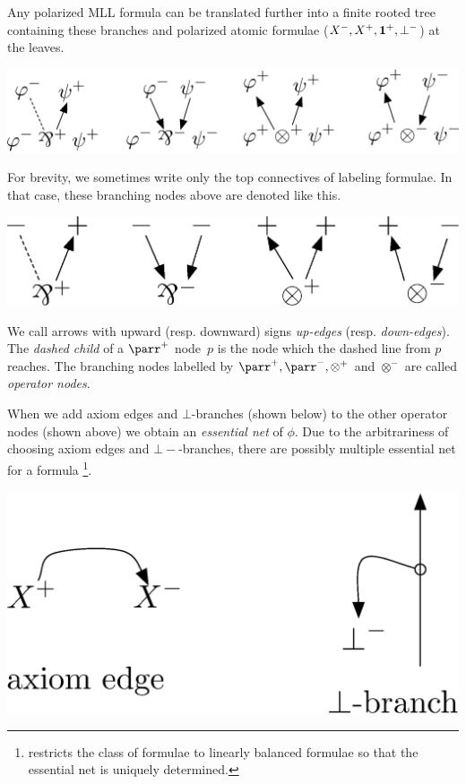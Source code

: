 Any polarized MLL formula can be translated further into
a finite rooted tree containing these branches and polarized atomic formulae
($X^-, X^+, \mathbf{1}^+,\bot^-$) at the leaves.
 \begin{center}
  \includegraphics[scale=0.4]{rules-original.eps}
 \end{center}
For brevity, we sometimes write only the top connectives of labeling
formulae.
In that case, these branching nodes above are denoted like this.
 \begin{center} %
  \includegraphics[scale=0.4]{rules.eps}
 \end{center}
We call arrows with upward (resp. downward) signs
\textit{up-edges}
(resp. \textit{down-edges}).
The \textit{dashed child}
of a $\parr^+$ node~$p$ is the node which the dashed
line from $p$ reaches.
The branching nodes labelled by $\parr^+, \parr^-, \otimes^+$ and
$\otimes^-$ are called \textit{operator nodes}.

When we add axiom edges and $\bot$-branches (shown below)
to the other operator nodes (shown above)
we obtain an \textit{essential net} of $\phi$.
Due to the arbitrariness of choosing axiom edges and $\bot-$-branches,
there are possibly multiple essential net for a formula%
\footnote{\citet{murawski2003} restricts the class of formulae to linearly balanced
formulae so that the essential net is uniquely determined.}.
 \begin{center}
  \includegraphics[scale=0.4]{axiom-cut.eps}
 \end{center}

